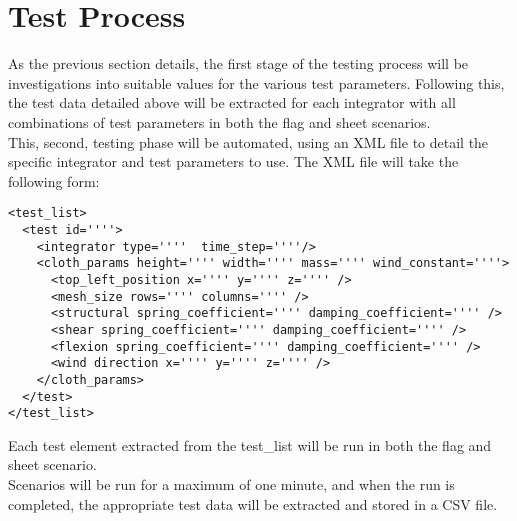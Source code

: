 \section{Test Process}
As the previous section details, the first stage of the testing process will be investigations into suitable values for the various test parameters. Following this, the test data detailed above will be extracted for each integrator with all combinations of test parameters in both the flag and sheet scenarios.
\\This, second, testing phase will be automated, using an XML file to detail the specific integrator and test parameters to use. The XML file will take the following form:
\begin{lstlisting}
<test_list>
  <test id=''''>
    <integrator type=''''  time_step=''''/>
    <cloth_params height='''' width='''' mass='''' wind_constant=''''>
      <top_left_position x='''' y='''' z='''' />
      <mesh_size rows='''' columns='''' />
      <structural spring_coefficient='''' damping_coefficient='''' />
      <shear spring_coefficient='''' damping_coefficient='''' />
      <flexion spring_coefficient='''' damping_coefficient='''' />
      <wind direction x='''' y='''' z='''' />
    </cloth_params>
  </test>
</test_list>
\end{lstlisting}
Each test element extracted from the test\_list will be run in both the flag and sheet scenario.
\\Scenarios will be run for a maximum of one minute, and when the run is completed, the appropriate test data will be extracted and stored in a CSV file.